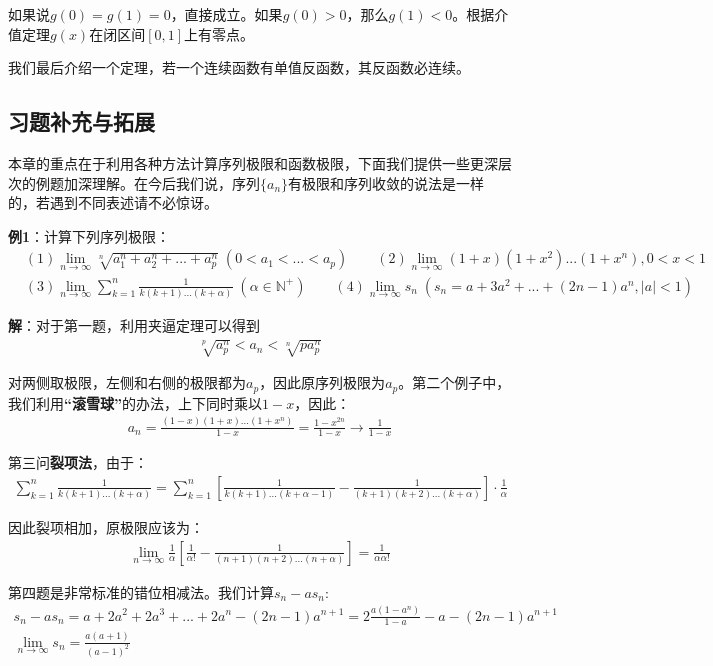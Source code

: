 \documentclass{ctexart}
\let\oldtextbf\textbf %
\renewcommand{\textbf}[1]{\textcolor{btex}{\oldtextbf{#1}}} %
\begin{document}
如果说$g(0)=g(1)=0$，直接成立。如果$g(0)>0$，那么$g(1)<0$。根据介值定理$g(x)$在闭区间$[0,1]$上有零点。

我们最后介绍一个定理，若一个连续函数有单值反函数，其反函数必连续。
\subsection{习题补充与拓展}
本章的重点在于利用各种方法计算序列极限和函数极限，下面我们提供一些更深层次的例题加深理解。在今后我们说，序列$\{a_n\}$有极限和序列收敛的说法是一样的，若遇到不同表述请不必惊讶。

\textbf{\color{btex}例1}：计算下列序列极限：
\begin{align*}
&(1) \lim_{n\to\infty }\sqrt[n]{a_1^n+a_2^n+...+a_p^n}\;(0<a_1<...<a_p)\qquad 
(2)\lim_{n\to\infty}(1+x)(1+x^2)...(1+x^n),0<x<1\\
&(3)\lim_{n\to\infty}\sum_{k=1}^n\frac{1}{k(k+1)...(k+\alpha)}\;(\alpha\in  \mathbb{N^+})\qquad
(4)\lim_{n\to\infty}s_n\;(s_n=a+3a^2+...+(2n-1)a^n,|a|<1) 
\end{align*}

\textbf{\color{btex}解}：对于第一题，利用夹逼定理可以得到
\begin{align*}
    \sqrt[p]{a_p^n}<a_n<\sqrt[n]{pa_p^n}
\end{align*}

对两侧取极限，左侧和右侧的极限都为$a_p$，因此原序列极限为$a_p$。第二个例子中，我们利用\textbf{\color{btex}“滚雪球”}的办法，上下同时乘以$1-x$，因此：
\begin{align*}
    a_n=\frac{(1-x)(1+x)...(1+x^n)}{1-x}=\frac{1-x^{2n}}{1-x}\to\frac{1}{1-x}
\end{align*}

第三问\textbf{\color{btex}裂项法}，由于：
\begin{align*}
    \sum_{k=1}^n\frac{1}{k(k+1)...(k+\alpha)}=\sum_{k=1}^n \left[\frac{1}{k(k+1)...(k+\alpha-1)}-\frac{1}{(k+1)(k+2)...(k+\alpha)}\right]\cdot\frac{1}{\alpha}
\end{align*}

因此裂项相加，原极限应该为：
\begin{align*}
\lim_{n\to\infty}\frac{1}{\alpha}\left[\frac{1}{\alpha!}-\frac{1}{(n+1)(n+2)...(n+\alpha)}\right]=\frac{1}{\alpha \alpha!}
\end{align*}

第四题是非常标准的错位相减法。我们计算$s_n-as_n$:
\begin{gather*}
    s_n-as_n=a+2a^2+2a^3+...+2a^n-(2n-1)a^{n+1}=2\frac{a(1-a^n)}{1-a}-a-(2n-1)a^{n+1}\\
    \lim_{n\to\infty}s_n=\frac{a(a+1)}{(a-1)^2}
\end{gather*}
\end{document}
